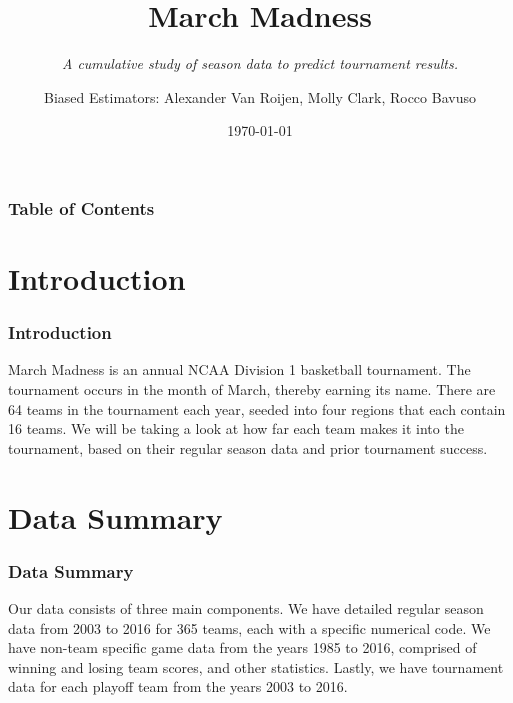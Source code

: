 \documentclass[11pt]{beamer}
\begin{document}
	\author{\footnotesize Biased Estimators: Alexander Van Roijen, Molly Clark, Rocco Bavuso}
	\title{{\textbf{\huge March Madness}}}
	\subtitle{{\textit{\footnotesize A cumulative study of season data to predict tournament results.}}}
	\date{\today}
	\begin{frame}[plain]
	\maketitle
\end{frame}
\begin{frame}
\frametitle{\textbf{\huge Table of Contents}}
\tableofcontents
\end{frame}
\section{Introduction}
\begin{frame}
\frametitle{{\textbf{\huge Introduction}}}
\begin{center}
March Madness is an annual NCAA Division 1 basketball tournament. The tournament occurs in the month of March, thereby earning its name. There are 64 teams in the tournament each year, seeded into four regions that each contain 16 teams. We will be taking a look at how far each team makes it into the tournament, based on their regular season data and prior tournament success.
\end{center}
\end{frame}
\section{Data Summary}
\begin{frame}
\frametitle{{\textbf{\huge Data Summary}}}
\center Our data consists of three main components. We have detailed regular season data from 2003 to 2016 for 365 teams, each with a specific numerical code. We have non-team specific game data from the years 1985 to 2016, comprised of winning and losing team scores, and other statistics. Lastly, we have tournament data  for each playoff team from the years 2003 to 2016.
\end{frame}
\end{document}
